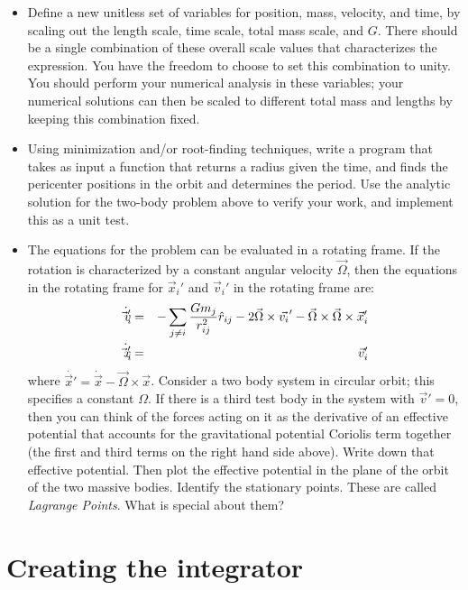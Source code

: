 \documentclass[11pt, preprint]{aastex}
\begin{document}
\begin{itemize}
\item Define a new unitless set of variables for position, mass,
  velocity, and time, by scaling out the length scale, time scale,
  total mass scale, and $G$. There should be a single combination of
  these overall scale values that characterizes the expression. You
  have the freedom to choose to set this combination to unity. You
  should perform your numerical analysis in these variables; your
  numerical solutions can then be scaled to different total mass and
  lengths by keeping this combination fixed.
\item Using minimization and/or root-finding techniques, write a
  program that takes as input a function that returns a radius given
  the time, and finds the pericenter positions in the orbit and
  determines the period. Use the analytic solution for the two-body
  problem above to verify your work, and implement this as a unit
  test.
\item The equations for the problem can be evaluated in a rotating
  frame. If the rotation is characterized by a constant angular
  velocity $\vec{\Omega}$, then the equations in the rotating frame
  for $\vec{x}_i'$ and $\vec{v}_i'$ in the rotating frame are:
  \begin{eqnarray}
    \dot{\vec{v}_i'} &=& - \sum_{j \ne i} \frac{Gm_j}{r_{ij}^2} {\hat
      r}_{ij}
    -2 \vec{\Omega}\times\vec{v_i}' -
    \vec{\Omega}\times\vec{\Omega}\times\vec{x}_i'  \cr
    \dot{\vec{x}_i'} &=& \vec{v}_i'
  \end{eqnarray}
  where $\dot{\vec{x}'} = \dot{\vec{x}} - \vec\Omega \times \vec{x}$.
  Consider a two body system in circular orbit; this specifies a
  constant $\Omega$. If there is a third test body in the system with
  $\vec{v}'=0$, then you can think of the forces acting on it as the
  derivative of an effective potential that accounts for the
  gravitational potential Coriolis term together (the first and third
  terms on the right hand side above). Write down that effective
  potential. Then plot the effective potential in the plane of the
  orbit of the two massive bodies. Identify the stationary
  points. These are called {\it Lagrange Points}. What is special
  about them?
\end{itemize}

\section{Creating the integrator}
\end{document}
